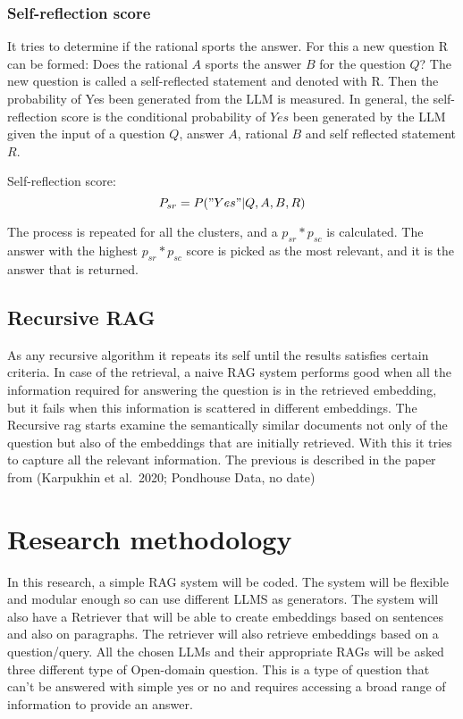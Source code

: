 \documentclass{wseas}
\begin{document}
\subsubsection{Self-reflection score}

It tries to determine if the rational sports the answer. For this a new
question R can be formed: Does the rational $A$ sports the answer
$B$ for the question $Q$? The new question is called a
self-reflected statement and denoted with R. Then the probability of Yes
been generated from the LLM is measured. In general, the self-reflection
score is the conditional probability of $Yes$ been generated by the
LLM given the input of a question $Q$, answer $A$, rational $B$ and self
reflected statement $R$.

Self-reflection score: \[
P_{sr} = P("Yes"|Q, A, B, R)
\]

The process is repeated for all the clusters, and a \(p_{sr}*p_{sc}\) is
calculated. The answer with the highest \(p_{sr}*p_{sc}\) score is
picked as the most relevant, and it is the answer that is returned.


\subsection{Recursive RAG}

As any recursive algorithm it repeats its self until the results
satisfies certain criteria. In case of the retrieval, a naive RAG system
performs good when all the information required for answering the
question is in the retrieved embedding, but it fails when this
information is scattered in different embeddings. The Recursive rag
starts examine the semantically similar documents not only of the
question but also of the embeddings that are initially retrieved. With
this it tries to capture all the relevant information. The previous is
described in the paper from (Karpukhin et al.~2020; Pondhouse Data, no
date) \cite{cite16} \cite{cite17}


\section{Research methodology}

In this research, a simple RAG system will be coded. The system will be
flexible and modular enough so can use different LLMS as generators. The
system will also have a Retriever that will be able to create embeddings
based on sentences and also on paragraphs. The retriever will also
retrieve embeddings based on a question/query. All the chosen LLMs and
their appropriate RAGs will be asked three different type of Open-domain
question. This is a type of question that can't be answered with simple
yes or no and requires accessing a broad range of information to provide
an answer.
\end{document}
